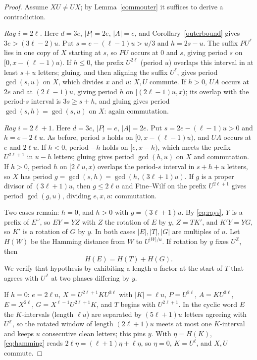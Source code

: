 \begin{proof}
Assume \(XU\ne UX\); by Lemma~\ref{commouter} it suffices to derive a contradiction.

\emph{Ray \(i=2\ell\).} Here \(d=3e\), \(|P|=2e\), \(|A|=e\), and Corollary~\ref{outerbound} gives \(3e>(3\ell-2)u\). Put \(s=e-(\ell-1)u>u/3\) and \(h=2s-u\). The suffix \(PU^\ell\) lies in one copy of \(X\) starting at \(s\), so \(PU\) occurs at \(0\) and \(s\), giving period \(s\) on \([0,x-(\ell-1)u)\). If \(h\le0\), the prefix \(U^{2\ell}\) (period \(u\)) overlaps this interval in at least \(s+u\) letters; gluing, and then aligning the suffix \(U^\ell\), gives period \(\gcd(s,u)\) on \(X\), which divides \(x\) and \(u\): \(X,U\) commute. If \(h>0\), \(UA\) occurs at \(2e\) and at \((2\ell-1)u\), giving period \(h\) on \([(2\ell-1)u,x)\); its overlap with the period-\(s\) interval is \(3s\ge s+h\), and gluing gives period \(\gcd(s,h)=\gcd(s,u)\) on \(X\): again commutation.

\emph{Ray \(i=2\ell+1\).} Here \(d=3e\), \(|P|=e\), \(|A|=2e\). Put \(s=2e-(\ell-1)u>0\) and \(h=e-2\ell u\). As before, period \(s\) holds on \([0,x-(\ell-1)u)\), and \(UA\) occurs at \(e\) and \(2\ell u\). If \(h<0\), period \(-h\) holds on \([e,x-h)\), which meets the prefix \(U^{2\ell+1}\) in \(u-h\) letters; gluing gives period \(\gcd(h,u)\) on \(X\) and commutation. If \(h>0\), period \(h\) on \([2\ell u,x)\) overlaps the period-\(s\) interval in \(s+h+u\) letters, so \(X\) has period \(g=\gcd(s,h)=\gcd(h,(3\ell+1)u)\). If \(g\) is a proper divisor of \((3\ell+1)u\), then \(g\le2\ell u\) and Fine--Wilf on the prefix \(U^{2\ell+1}\) gives period \(\gcd(g,u)\), dividing \(e,x,u\): commutation.

Two cases remain: \(h=0\), and \(h>0\) with \(g=(3\ell+1)u\). By \eqref{eq:rays}, \(Y\) is a prefix of \(E^\omega\), so \(EY=YZ\) with \(Z\) the rotation of \(E\) by \(y\), \(Z=TK'\), and \(K'Y=YG\), so \(K'\) is a rotation of \(G\) by \(y\). In both cases \(|E|,|T|,|G|\) are multiples of \(u\). Let \(H(W)\) be the Hamming distance from \(W\) to \(U^{|W|/u}\). If rotation by \(y\) fixes \(U^{\mathbb Z}\), then
\begin{equation}\label{eq:hamming}
H(E)=H(T)+H(G).
\end{equation}
We verify that hypothesis by exhibiting a length-\(u\) factor at the start of \(T\) that agrees with \(U^{\mathbb Z}\) at two phases differing by \(y\).

If \(h=0\): \(e=2\ell u\), \(X=U^{2\ell+1}KU^{3\ell}\) with \(|K|=\ell u\), \(P=U^{2\ell}\), \(A=KU^{3\ell}\), \(E=X^{2\ell}\), \(G=X^{\ell-1}U^{2\ell+1}K\), and \(T\) begins with \(U^{2\ell+1}\). In the cyclic word \(E\) the \(K\)-intervals (length \(\ell u\)) are separated by \((5\ell+1)u\) letters agreeing with \(U^{\mathbb Z}\), so the rotated window of length \((2\ell+1)u\) meets at most one \(K\)-interval and keeps \(u\) consecutive clean letters; this pins \(y\). With \(\eta=H(K)\), \eqref{eq:hamming} reads \(2\ell\eta=(\ell+1)\eta+\ell\eta\), so \(\eta=0\), \(K=U^\ell\), and \(X,U\) commute.


\end{proof}
